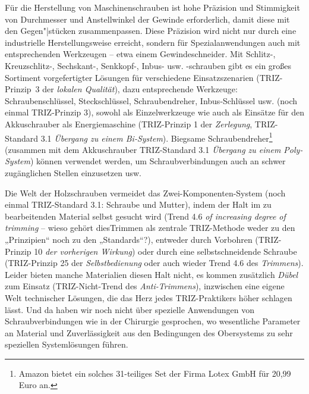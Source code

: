 \documentclass[12pt,a4paper]{article}
\begin{document}
Für die Herstellung von Maschinenschrauben ist hohe Präzision und Stimmigkeit
von Durchmesser und Anstellwinkel der Gewinde erforderlich, damit diese mit
den Gegen"|stücken zusammenpassen.  Diese Präzision wird nicht nur durch eine
industrielle Herstellungsweise erreicht, sondern für Spezialanwendungen auch
mit entsprechenden Werkzeugen -- etwa einem Gewindeschneider.  Mit Schlitz-,
Kreuzschlitz-, Sechskant-, Senkkopf-, Inbus- usw. -schrauben gibt es ein
großes Sortiment vorgefertigter Lösungen für verschiedene Einsatzszenarien
(TRIZ-Prinzip~3 der \emph{lokalen Qualität}), dazu entsprechende Werkzeuge:
Schraubenschlüssel, Steckschlüssel, Schraubendreher, Inbus-Schlüssel
usw. (noch einmal TRIZ-Prinzip 3), sowohl als Einzelwerkzeuge wie auch als
Einsätze für den Akkuschrauber als Energiemaschine (TRIZ-Prinzip 1 der
\emph{Zerlegung}, TRIZ-Standard 3.1 \emph{Übergang zu einem Bi-System}).
Biegsame Schraubendreher\footnote{Amazon bietet ein solches 31-teiliges Set
  der Firma Lotex GmbH für 20,99 Euro an.} (zusammen mit dem Akkuschrauber
TRIZ-Standard 3.1 \emph{Übergang zu einem Poly-System}) können verwendet
werden, um Schraubverbindungen auch an schwer zugänglichen Stellen einzusetzen
usw.

Die Welt der Holzschrauben vermeidet das Zwei-Komponenten-System (noch einmal
TRIZ-Standard 3.1: Schraube und Mutter), indem der Halt im zu bearbeitenden
Material selbst gesucht wird (Trend 4.6 \emph{of increasing degree of
  trimming} -- wieso gehört diesTrimmen als zentrale TRIZ-Methode weder zu den
„Prinzipien“ noch zu den „Standards“?), entweder durch Vorbohren (TRIZ-Prinzip
10 \emph{der vorherigen Wirkung}) oder durch eine selbstschneidende Schraube
(TRIZ-Prinzip 25 der \emph{Selbstbedienung} oder auch wieder Trend 4.6 des
\emph{Trimmens}). Leider bieten manche Materialien diesen Halt nicht, es
kommen zusätzlich \emph{Dübel} zum Einsatz (TRIZ-Nicht-Trend des
\emph{Anti-Trimmens}), inzwischen eine eigene Welt technischer Lösungen, die
das Herz jedes TRIZ-Praktikers höher schlagen lässt.  Und da haben wir noch
nicht über spezielle Anwendungen von Schraubverbindungen wie in der Chirurgie
gesprochen, wo wesentliche Parameter an Material und Zuverlässigkeit aus den
Bedingungen des Obersystems zu sehr speziellen Systemlösungen führen.
\end{document}
